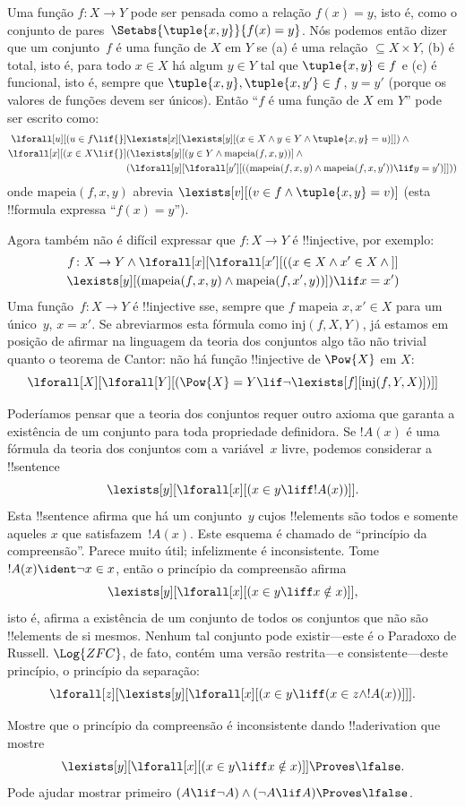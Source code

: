 \documentclass[../../../include/open-logic-section]{subfiles}
\begin{document}
Uma função $f \colon X \to Y$ pode ser pensada como a relação $f(x)
= y$, isto é, como o conjunto de pares~$\Setabs{\tuple{x,y}}{f(x) = y}$. Nós
podemos então dizer que um conjunto~$f$ é uma função de $X$ em $Y$ se (a) é
uma relação $\subseteq X \times Y$, (b) é total, isto é, para todo $x
\in X$ há algum $y \in Y$ tal que $\tuple{x, y} \in f$ e (c)
é funcional, isto é, sempre que $\tuple{x, y}, \tuple{x, y'} \in f$,
$y = y'$ (porque os valores de funções devem ser únicos). Então ``$f$ é uma
função de $X$ em $Y$'' pode ser escrito como:
\begin{align*}
 \lforall[u][(u \in f \lif {}] & \lexists[x][\lexists[y][(x \in X \land y \in
      Y \land \tuple{x, y} = u)]]) \land {}\\
 \lforall[x][(x \in X \lif {}] &
      (\lexists[y][(y \in Y \land \mathrm{mapeia}(f, x, y))] \land {}\\
& (\lforall[y][\lforall[y'][((\mathrm{mapeia}(f, x, y) \land
    \mathrm{mapeia}(f, x, y')) \lif y = y')]]))
\end{align*}
onde $\mathrm{mapeia}(f, x, y)$ abrevia $\lexists[v][(v \in f \land
  \tuple{x, y} = v)]$ (esta !!{formula} expressa ``$f(x) = y$'').

Agora também não é difícil expressar que $f\colon X \to Y$ é
!!{injective}, por exemplo:
\begin{multline*}
 f \colon X \to Y \land \lforall[x][\lforall[x'][((x \in X \land x' \in
     X \land {}]] \\
 \lexists[y][(\mathrm{mapeia}(f, x, y) \land \mathrm{mapeia}(f,
        x', y))]) \lif x = x')
\end{multline*}
Uma função~$f\colon X \to Y$ é !!{injective} sse, sempre que $f$ mapeia $x, x'
\in X$ para um único~$y$, $x = x'$.  Se abreviarmos esta fórmula como
$\mathrm{inj}(f, X, Y)$, já estamos em posição de afirmar na
linguagem da teoria dos conjuntos algo tão não trivial quanto o teorema de Cantor:
não há função !!{injective} de $\Pow{X}$ em $X$:
\[
\lforall[X][\lforall[Y][(\Pow{X} = Y \lif
    \lnot\lexists[f][\mathrm{inj}(f, Y, X)])]]
\]

Poderíamos pensar que a teoria dos conjuntos requer outro axioma que garanta
a existência de um conjunto para toda propriedade definidora. Se $!A(x)$ é uma
fórmula da teoria dos conjuntos com a variável~$x$ livre, podemos considerar a
!!{sentence}
\[
\lexists[y][\lforall[x][(x \in y \liff !A(x))]].
\]
Esta !!{sentence} afirma que há um conjunto~$y$ cujos !!{element}s
são todos e somente aqueles $x$ que satisfazem~$!A(x)$. Este esquema é chamado de
``princípio da compreensão''.  Parece muito útil; infelizmente
é inconsistente.  Tome $!A(x) \ident \lnot x \in x$, então o
princípio da compreensão afirma
\[
\lexists[y][\lforall[x][(x \in y \liff x \notin x)]],
\]
isto é, afirma a existência de um conjunto de todos os conjuntos que não são
!!{element}s de si mesmos. Nenhum tal conjunto pode existir---este é o
Paradoxo de Russell.  $\Log{ZFC}$, de fato, contém uma versão restrita---e
consistente---deste princípio, o princípio da separação:
\[
\lforall[z][\lexists[y][\lforall[x][(x \in y \liff (x \in z \land
      !A(x))]]].
\]

\begin{prob}
Mostre que o princípio da compreensão é inconsistente dando
!!a{derivation} que mostre
\[
\lexists[y][\lforall[x][(x \in y \liff x \notin x)]] \Proves \lfalse.
\]
Pode ajudar mostrar primeiro $(A \lif \lnot A) \land (\lnot A \lif A)
\Proves \lfalse$.
\end{prob}
\end{document}
